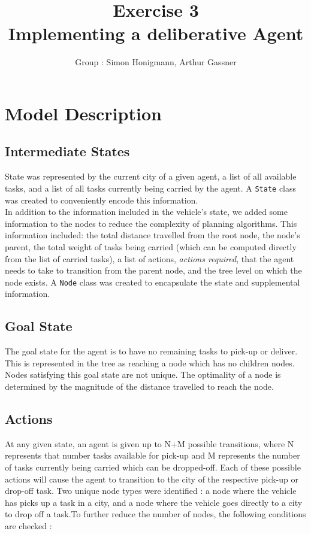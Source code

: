 \documentclass[11pt]{article}
\title{\bf Exercise 3\\ Implementing a deliberative Agent}
\author{Group \textnumero76: Simon Honigmann, Arthur Gassner}
\begin{document}
\maketitle

\section{Model Description}

\subsection{Intermediate States}
State was represented by the current city of a given agent, a list of all available tasks, and a list of all tasks currently being carried by the agent. A \texttt{State} class was created to conveniently encode this information. \\

In addition to the information included in the vehicle's state, we added some information to the nodes to reduce the complexity of planning algorithms. This information included: the total distance travelled from the root node, the node's parent, the total weight of tasks being carried (which can be computed directly from the list of carried tasks), a list of actions, \textit{actions required}, that the agent needs to take to transition from the parent node, and the tree level on which the node exists. A \texttt{Node} class was created to encapsulate the state and supplemental information. 
\subsection{Goal State}
The goal state for the agent is to have no remaining tasks to pick-up or deliver. This is represented in the tree as reaching a node which has no children nodes. Nodes satisfying this goal state are not unique. The optimality of a node is determined by the magnitude of the distance travelled to reach the node. 

\subsection{Actions}
At any given state, an agent is given up to N+M possible transitions, where N represents that number tasks available for pick-up and M represents the number of tasks currently being carried which can be dropped-off. Each of these possible actions will cause the agent to transition to the city of the respective pick-up or drop-off task. Two unique node types were identified : a node where the vehicle has picks up a task in a city, and a node where the vehicle goes directly to a city to drop off a task.To further reduce the number of nodes, the following conditions are checked :
\end{document}
